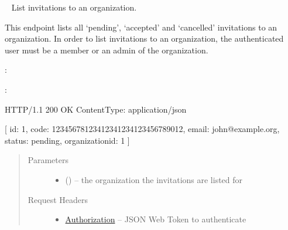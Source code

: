 \documentclass[letterpaper,10pt,english]{sphinxmanual}
\begin{document}
\begin{fulllineitems}
\label{\detokenize{resources/organization:get--organizations-(organization_id)-invitations}}~
List invitations to an organization.

This endpoint lists all `pending', `accepted' and `cancelled'
invitations to an organization. In order to list invitations to an
organization, the authenticated user must be a member or an admin of
the organization.

:

\begin{sphinxVerbatim}[commandchars=\\\{\}]
  
 
 
\end{sphinxVerbatim}

:

\begin{sphinxVerbatim}[commandchars=\\\{\}]
HTTP/1.1 200 OK
Content\PYGZhy{}Type: application/json

[
    \PYGZob{}
        \PYGZsq{}id\PYGZsq{}: 1,
        \PYGZsq{}code\PYGZsq{}: \PYGZsq{}12345678\PYGZhy{}1234\PYGZhy{}1234\PYGZhy{}1234\PYGZhy{}123456789012\PYGZsq{},
        \PYGZsq{}email\PYGZsq{}: \PYGZsq{}john@example.org\PYGZsq{},
        \PYGZsq{}status\PYGZsq{}: \PYGZsq{}pending\PYGZsq{},
        \PYGZsq{}organization\PYGZus{}id\PYGZsq{}: 1
    \PYGZcb{}
]
\end{sphinxVerbatim}
\begin{quote}\begin{description}
\item[{Parameters}] \leavevmode\begin{itemize}
\item {} 
 () -- the organization the invitations are
listed for

\end{itemize}

\item[{Request Headers}] \leavevmode\begin{itemize}
\item {} 
\href{http://tools.ietf.org/html/rfc7235\#section-4.2}{Authorization} -- JSON Web Token to authenticate


\end{itemize}
\end{description}
\end{quote}
\end{fulllineitems}
\end{document}
